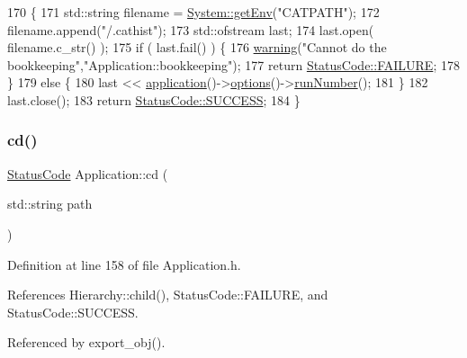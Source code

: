 \begin{DoxyCode}
170                                       \{
171   std::string filename = \hyperlink{namespaceSystem_af83af19ba6c1083e5643390dfd65f7aa}{System::getEnv}(\textcolor{stringliteral}{"CATPATH"});
172   filename.append(\textcolor{stringliteral}{"/.cathist"});
173   std::ofstream last;
174   last.open( filename.c\_str() );
175   \textcolor{keywordflow}{if} ( last.fail() ) \{
176     \hyperlink{classObject_a65cd4fda577711660821fd2cd5a3b4c9}{warning}(\textcolor{stringliteral}{"Cannot do the bookkeeping"},\textcolor{stringliteral}{"Application::bookkeeping"});
177     \textcolor{keywordflow}{return} \hyperlink{classStatusCode_a6f565cbeadc76d14c72f047e5e85eb4ba3da73d4c469762eb9d3c960368252b26}{StatusCode::FAILURE};
178   \}
179   \textcolor{keywordflow}{else} \{
180     last << \hyperlink{Tools_8h_a27885a3c35afe79029fb830f32f66458}{application}()->\hyperlink{classApplication_ada7cc0e8db586985f1435aee0c79f47d}{options}()->\hyperlink{classOptions_a2d9447919fe90f9ce8df5530526cbb27}{runNumber}();
181   \}
182   last.close();
183   \textcolor{keywordflow}{return} \hyperlink{classStatusCode_a6f565cbeadc76d14c72f047e5e85eb4badd0da38d3ba0d922efd1f4619bc37ad8}{StatusCode::SUCCESS};
184 \}
\end{DoxyCode}
\mbox{\label{classApplication_a29aa0687ea27762ce36ab4195bf5d77f}} 
\subsubsection{\texorpdfstring{cd()}{cd()}}
{\footnotesize\ttfamily \hyperlink{classStatusCode}{Status\+Code} Application\+::cd (\begin{DoxyParamCaption}\item[{std\+::string}]{path }\end{DoxyParamCaption})\hspace{0.3cm}{\ttfamily [inline]}}



Definition at line 158 of file Application.\+h.



References Hierarchy\+::child(), Status\+Code\+::\+F\+A\+I\+L\+U\+RE, and Status\+Code\+::\+S\+U\+C\+C\+E\+SS.



Referenced by export\+\_\+obj().


